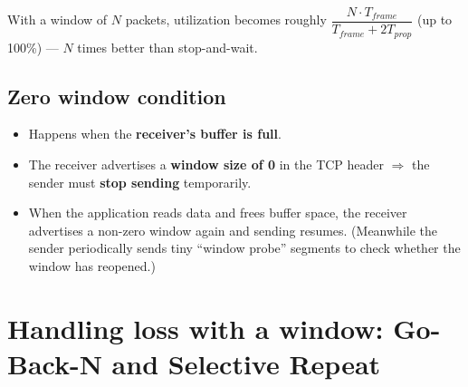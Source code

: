 With a window of $N$ packets, utilization becomes roughly $\dfrac{N\cdot T_{frame}}{T_{frame}+2T_{prop}}$ (up to 100\%) --- $N$ times better than stop-and-wait.

\subsection{Zero window condition}
\begin{itemize}
  \item Happens when the \textbf{receiver's buffer is full}.
  \item The receiver advertises a \textbf{window size of 0} in the TCP header $\Rightarrow$ the sender must \textbf{stop sending} temporarily.
  \item When the application reads data and frees buffer space, the receiver advertises a non-zero window again and sending resumes. (Meanwhile the sender periodically sends tiny ``window probe'' segments to check whether the window has reopened.)
\end{itemize}

\begin{center}
\end{center}

\section{Handling loss with a window: Go-Back-N and Selective Repeat}

